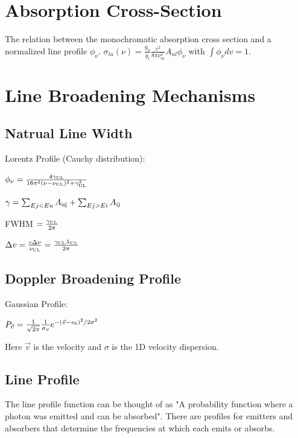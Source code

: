 \section{Absorption Cross-Section}
The relation between the monochromatic absorption cross section and a normalized
line profile $\phi_\nu$.
$\sigma_{lu}(\nu) = \frac{g_u}{g_l}\frac{c^2}{8\pi\nu^2_{lu}} A_{ul}\phi_\nu$
with
$\int \phi_\nu dv = 1.$

\section{Line Broadening Mechanisms}

    \subsection{Natrual Line Width}
    
        Lorentz Profile (Cauchy distribution):
        
        $ \phi_{\nu} = \frac{4 \gamma_{\rm UL}}{16 \pi^2 (\nu - \nu_{\rm UL})^2 + \gamma_{\rm UL}^2}$
        
        $\gamma = \sum_{Ej < Eu} A_{\rm uj} + \sum_{Ej > Ei} A_{\rm ij}$
        
        FWHM $ = \frac{\gamma_{\rm UL}}{2 \pi}$
        
        $\Delta v = \frac{c \Delta \nu}{\nu_{\rm UL}} = \frac{\gamma_{\rm UL} \lambda_{\rm UL}}{2 \pi} $
    
    \subsection{Doppler Broadening Profile}
    
        Gaussian Profile:
        
        $P_{\Vec{v}} = \frac{1}{\sqrt{2 \pi}} \frac{1}{\sigma_{\Vec{v}}} 
            e^{-(\Vec{v} - v_{\rm 0})^2 / 2 \sigma^2} $ 
            
        Here $\Vec{v}$ is the velocity and $\sigma$ is the 1D velocity dispersion.
        
    \subsection{Line Profile}\label{sec:line_profile}
    
        The line profile function can be thought of as "A probability function where a photon was emitted and can be absorbed". There are profiles for emitters and absorbers that determine the frequencies at which each emits or absorbs.
    
